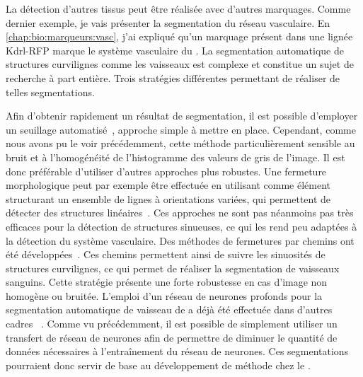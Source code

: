 \documentclass[\main/main.tex]{subfiles}
\begin{document}
%
La détection d'autres tissus peut être réalisée avec d'autres marquages. Comme dernier exemple, je vais présenter la segmentation du réseau vasculaire.
En \autoref{chap:bio:marqueurs:vasc}, j'ai expliqué qu'un marquage présent dans une lignée Kdrl-RFP marque le système vasculaire du \pz{}.
%
La segmentation automatique de structures curvilignes comme les vaisseaux est complexe et constitue un sujet de recherche à part entière. Trois stratégies différentes permettant de réaliser de telles segmentations.

%
Afin d'obtenir rapidement un résultat de segmentation, il est possible d'employer un seuillage automatisé~\cite{kugler_2019}, approche simple à mettre en place.
%
Cependant, comme nous avons pu le voir précédemment, cette méthode particulièrement sensible au bruit et à l'homogénéité de l'histogramme des valeurs de gris de l'image. Il est donc préférable d'utiliser d'autres approches plus robustes. Une fermeture morphologique peut par exemple être effectuée en utilisant comme élément structurant un ensemble de lignes à orientations variées, qui permettent de détecter des structures linéaires~\cite{Soille_2001}. Ces approches ne sont pas néanmoins pas très efficaces pour la détection de structures sinueuses, ce qui les rend peu adaptées à la détection du système vasculaire.
%
Des méthodes de fermetures par chemins ont été développées~\cite{talbot_2007,merveille_2018}. Ces chemins permettent ainsi de suivre les sinuosités de structures curvilignes, ce qui permet de réaliser la segmentation de vaisseaux sanguins. Cette stratégie présente une forte robustesse en cas d'image non homogène ou bruitée.
%
L'emploi d'un réseau de neurones profonds pour la segmentation automatique de vaisseau de \pz{} a déjà été effectuée dans d'autres cadres ~\cite{zhang_2019a, daetwyler_2019}.
%
Comme vu précédemment, il est possible de simplement utiliser un transfert de réseau de neurones afin de permettre de diminuer le quantité de données nécessaires à l'entraînement du réseau de neurones. Ces segmentations pourraient donc servir de base au développement de méthode chez le \pz{}.
\end{document}
